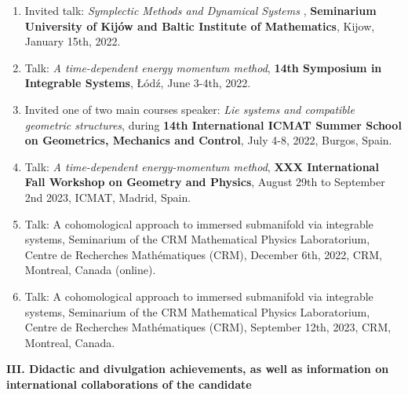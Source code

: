 \documentclass[12pt,reqno]{amsbook}
\begin{document}
\begin{enumerate}
\item Invited talk: {\it Symplectic Methods and Dynamical Systems }, {\bf Seminarium University of Kij\'ow and Baltic Institute of Mathematics}, Kijow, January 15th, 2022.

\item Talk: {\it A time-dependent energy momentum method}, {\bf 
14th Symposium in Integrable Systems}, \L\'od\'z, June 3-4th, 2022.


\item Invited one of two main courses speaker: {\it Lie systems and compatible geometric structures},  during {\bf 14th International ICMAT Summer School on Geometrics, Mechanics and Control}, July 4-8, 2022, Burgos, Spain.

\item Talk: {\it A time-dependent energy-momentum method}, {\bf 
XXX International Fall Workshop on Geometry and Physics}, August 29th to September 2nd 2023, ICMAT, Madrid, Spain.

\item Talk: A cohomological approach to immersed submanifold via integrable systems, Seminarium of the CRM  Mathematical Physics Laboratorium, Centre de Recherches Math\'ematiques (CRM), December 6th, 2022, CRM, Montreal, Canada (online).
\item Talk: A cohomological approach to immersed submanifold via integrable systems, Seminarium of the CRM  Mathematical Physics Laboratorium, Centre de Recherches Math\'ematiques (CRM), September 12th, 2023, CRM, Montreal, Canada.

%

\end{enumerate}


\color{blue}



\begin{center}
\large\textbf{ III. Didactic and divulgation achievements, as well as information on international collaborations of the candidate}
\end{center}
\color{black}
\vspace{1cm}
\vspace{0.5cm}
\end{document}
